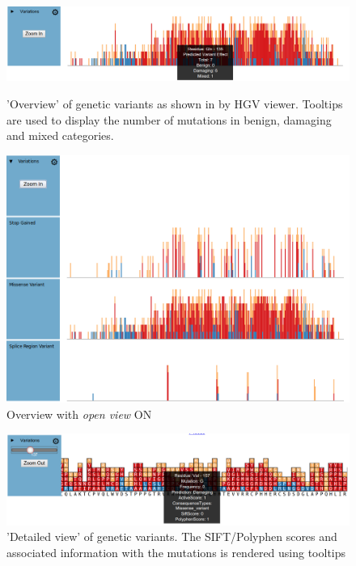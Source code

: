 \documentclass[twoside]{article}
\begin{document}
\begin{multicols}{2}
\begin{figure}
\includegraphics[width=\linewidth]{images/overview_withtooltip}
\label{overviewtooltip}
\caption{'Overview' of genetic variants as shown in by HGV viewer. Tooltips are used to display the number of mutations in benign, damaging and mixed categories.}
\end{figure}
\begin{figure}

\includegraphics[width=\linewidth]{images/openview}
\caption{Overview with \textit{open view} ON}
\label{openview}
\end{figure}

\begin{figure}
\includegraphics[width=\linewidth]{images/zoomed_withtooltip}
\caption{'Detailed view' of genetic variants. The SIFT/Polyphen scores and associated information with the mutations is rendered using tooltips}
\label{zoomedtooltip}
\end{figure}


\end{multicols}
\end{document}

